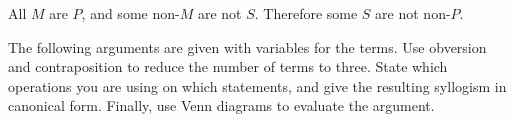 \begin{exercises}
\item All $M$ are $P$, and some non-$M$ are not $S$. Therefore some $S$ are not non-$P$. 

\end{exercises}	
\noindent\problempart The following arguments are given with variables for the terms. Use obversion and contraposition to reduce the number of terms to three. State which operations you are using on which statements, and give the resulting syllogism in canonical form. Finally, use Venn diagrams to evaluate the argument.
